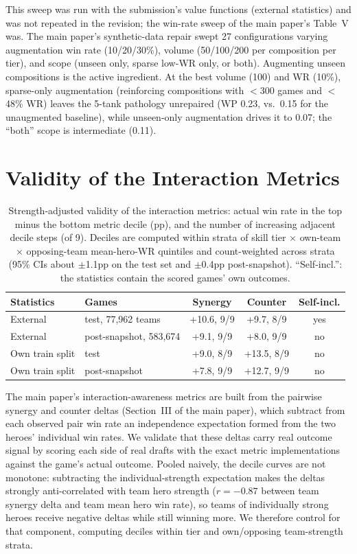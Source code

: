 \documentclass[journal]{IEEEtran}
\newcommand{\added}[1]{{\color{blue}#1}}
\newcommand{\added}[1]{#1}
\begin{document}
\added{This sweep was run with the submission's value functions (external statistics) and was not repeated in the revision; the win-rate sweep of the main paper's Table~V was.} The main paper's synthetic-data repair swept 27 configurations varying
augmentation win rate (10/20/30\%), volume (50/100/200 per composition
per tier), and scope (unseen only, sparse low-WR only, or both).
Augmenting unseen compositions is the active ingredient. At the best
volume (100) and WR (10\%), sparse-only augmentation (reinforcing
compositions with $<$300 games and $<$48\% WR) leaves the 5-tank
pathology unrepaired (WP 0.23, vs.\ 0.15 for the unaugmented baseline),
while unseen-only augmentation drives it to 0.07; the ``both'' scope is
intermediate (0.11).

\section{Validity of the Interaction Metrics}
\label{sec:metricvalid}

\begin{table}[t]
\centering
\caption{\added{Strength-adjusted validity of the interaction metrics: actual win rate in the top minus the bottom metric decile (pp), and the number of increasing adjacent decile steps (of 9). Deciles are computed within strata of skill tier $\times$ own-team $\times$ opposing-team mean-hero-WR quintiles and count-weighted across strata (95\% CIs about $\pm$1.1pp on the test set and $\pm$0.4pp post-snapshot). ``Self-incl.'': the statistics contain the scored games' own outcomes.}}
\label{tab:metricvalid}
\setlength{\tabcolsep}{4pt}
\begin{tabular}{llccc}
\toprule
Statistics & Games & Synergy & Counter & Self-incl. \\
\midrule
External & test, 77,962 teams & +10.6, 9/9 & +9.7, 8/9 & yes \\
External & post-snapshot, 583,674 & +9.1, 9/9 & +8.0, 9/9 & no \\
Own train split & test & +9.0, 8/9 & +13.5, 8/9 & no \\
Own train split & post-snapshot & +7.8, 9/9 & +12.7, 9/9 & no \\
\bottomrule
\end{tabular}
\end{table}

The main paper's interaction-awareness metrics are built from the pairwise synergy and counter deltas (Section~III of the main paper), which subtract from each observed pair win rate an independence expectation formed from the two heroes' individual win rates. We validate that these deltas carry real outcome signal by scoring each side of real drafts with the exact metric implementations against the game's actual outcome. Pooled naively, the decile curves are not monotone: subtracting the individual-strength expectation makes the deltas strongly anti-correlated with team hero strength ($r = -0.87$ between team synergy delta and team mean hero win rate), so teams of individually strong heroes receive negative deltas while still winning more. We therefore control for that component, computing deciles within tier and own/opposing team-strength strata.
\end{document}
